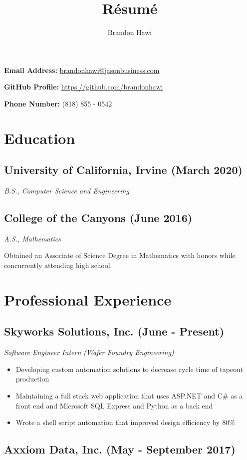 \documentclass[10pt]{article}
\makeatletter
\renewcommand{\maketitle}
{
\begin{flushleft}
\huge
\textbf{\theauthor}
\small

\textbf{Email Address: }\href{mailto:brandonhawi@jasonbusiness.com}{brandonhawi@jasonbusiness.com}

\textbf{GitHub Profile: }\href{https://github.com/brandonhawi}{https://github.com/brandonhawi}

\textbf{Phone Number: }(818) 855 - 0542
\end{flushleft}
}
\makeatother
\begin{document}
\title{R\'esum\'e}
\author{Brandon Hawi}

\maketitle
\vspace{-0.1in}
\section{Education}

\subsection{University of California, Irvine (March 2020)}
\noindent\textit{B.S., Computer Science and Engineering}

\subsection{College of the Canyons (June 2016)}
\noindent\textit{A.S., Mathematics}

Obtained an Associate of Science Degree in Mathematics with honors while concurrently attending
high school.

\section{Professional Experience}

\subsection{Skyworks Solutions, Inc. (June - Present)}

\noindent\textit{Software Engineer Intern (Wafer Foundry Engineering)}

\begin{itemize}
	\setlength\itemsep{0em}
	\item Developing custom automation solutions to decrease cycle time of tapeout production
	\item Maintaining a full stack web application that uses ASP.NET and C\# as a front end and Microsoft SQL Express and Python as a back end
	\item Wrote a shell script automation that improved design efficiency by 80\%
\end{itemize}

\subsection{Axxiom Data, Inc. (May - September 2017)}
\end{document}
